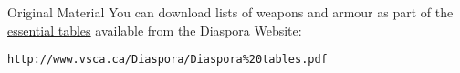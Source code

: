 
\begin{sidebox}{Original Material}
You can download lists of weapons and armour as part of the \href{http://www.vsca.ca/Diaspora/Diaspora%20tables.pdf}{essential tables}%
available from the Diaspora Website:

\texttt{http://www.vsca.ca/Diaspora/Diaspora\%20tables.pdf}
\end{sidebox}
